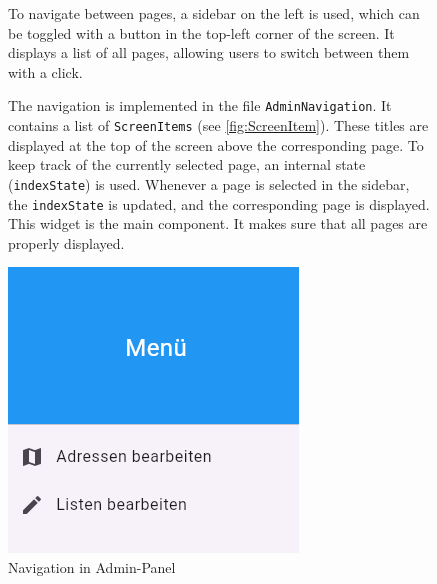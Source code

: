 \begin{figure}[H]

\begin{minipage}{0.58\textwidth}
    To navigate between pages, a sidebar on the left is used, which can be toggled with a button in the top-left corner of the screen. It displays a list of all pages, allowing users to switch between them with a click.

    The navigation is implemented in the file \texttt{AdminNavigation}. It contains a list of \texttt{ScreenItems} (see \ref{fig:ScreenItem}). These titles are displayed at the top of the screen above the corresponding page. To keep track of the currently selected page, an internal state (\texttt{indexState}) is used. Whenever a page is selected in the sidebar, the \texttt{indexState} is updated, and the corresponding page is displayed. This widget is the main component. It makes sure that all pages are properly displayed.

    \end{minipage}
    \hfill
    \begin{minipage}{0.38\textwidth}
    \centering
    \includegraphics[width=\linewidth]{images/AdminPanel/Menu.png}
    \caption{Navigation in Admin-Panel}
    \label{fig:adminpanel_navigation}
\end{minipage}

\end{figure}

